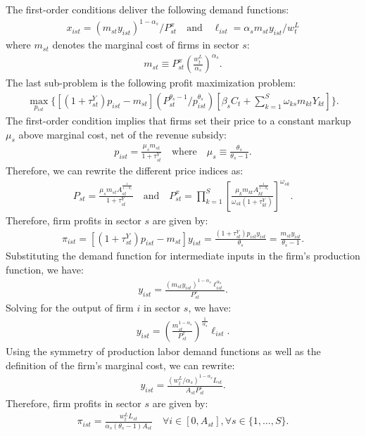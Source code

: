 \documentclass[12pt]{article}
\begin{document}
The first-order conditions deliver the following demand functions:
\begin{align*}
x_{ist} = (m_{st} y_{ist})^{1 - \alpha_s} / P_{st}^x \quad \text{and} \quad \ell_{ist} = \alpha_s m_{st} y_{ist} / w_t^L
\end{align*}
where $m_{st}$ denotes the marginal cost of firms in sector $s$:
\begin{align*}
m_{st} \equiv P_{st}^x \left(\frac{w_t^L}{\alpha_s}\right)^{\alpha_s}.
\end{align*}
The last sub-problem is the following profit maximization problem:
\begin{align*}
\max_{p_{ist}}\{[(1 + \tau_{st}^Y) p_{ist} - m_{st}] (P_{st}^{\theta_s - 1} / p_{ist}^{\theta_s}) [\beta_s C_t + \sum_{k = 1}^S \omega_{ks} m_{kt} Y_{kt}]\}.
\end{align*}
The first-order condition implies that firms set their price to a constant markup $\mu_s$ above marginal cost, net of the revenue subsidy:
\begin{align*}
p_{ist} = \frac{\mu_s m_{st}}{1 + \tau_{st}^Y} \quad \text{where} \quad \mu_s \equiv \frac{\theta_s}{\theta_s - 1}.
\end{align*}
Therefore, we can rewrite the different price indices as:
\begin{align*}
P_{st} = \frac{\mu_s m_{st} A_{st}^{\frac{1}{1 - \theta_s}}}{1 + \tau_{st}^Y} \quad \text{and} \quad P_{st}^x = \prod_{k = 1}^S \left[\frac{\mu_k m_{kt} A_{kt}^{\frac{1}{1 - \theta_k}}}{\omega_{sk} (1 + \tau_{kt}^Y)}\right]^{\omega_{sk}}.
\end{align*}
Therefore, firm profits in sector $s$ are given by:
\begin{align*}
\pi_{ist} = [(1 + \tau_{st}^Y) p_{ist} - m_{st}] y_{ist} = \frac{(1 + \tau_{st}^Y) p_{ist} y_{ist}}{\theta_s} = \frac{m_{st} y_{ist}}{\theta_s - 1}.
\end{align*}
Substituting the demand function for intermediate inputs in the firm's production function, we have:
\begin{align*}
y_{ist} = \frac{(m_{st} y_{ist})^{1 - \alpha_s} \ell_{ist}^{\alpha_s}}{P_{st}^x}.
\end{align*}
Solving for the output of firm $i$ in sector $s$, we have:
\begin{align*}
y_{ist} = \left(\frac{m_{st}^{1 - \alpha_s}}{P_{st}^x}\right)^{\frac{1}{\alpha_s}} \ell_{ist}.
\end{align*}
Using the symmetry of production labor demand functions as well as the definition of the firm's marginal cost, we can rewrite:
\begin{align*}
y_{ist} = \frac{(w_t^L / \alpha_s)^{1 - \alpha_s} L_{st}}{A_{st} P_{st}^x}.
\end{align*}
Therefore, firm profits in sector $s$ are given by:
\begin{align*}
\pi_{ist} = \frac{w_t^L L_{st}}{\alpha_s (\theta_s - 1) A_{st}} \quad \forall i \in [0, A_{st}], \forall s \in \{1, \ldots, S\}.
\end{align*}
\end{document}
